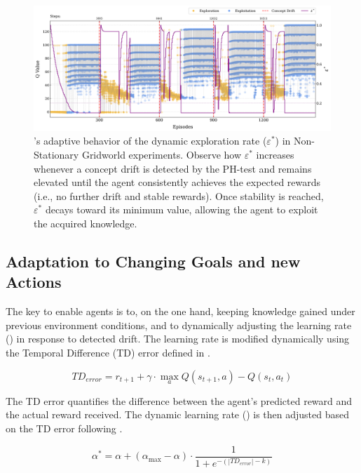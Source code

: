 \begin{figure}[hptb]
    \centering
    \includegraphics[width=\textwidth]{figures/eps}
    \caption{\adaptiverl's adaptive behavior of the dynamic exploration rate ($\varepsilon^*$) in Non-Stationary Gridworld experiments. Observe how $\varepsilon^*$ increases whenever a concept drift is detected by the PH-test and remains elevated until the agent consistently achieves the expected rewards (i.e., no further drift and stable rewards). Once stability is reached, $\varepsilon^*$ decays toward its minimum value, allowing the agent to exploit the acquired knowledge.}
    \label{fig:dynamic-eps}
\end{figure}

\subsection{Adaptation to Changing Goals and new Actions}
\label{sec:morphin-adaptation}

The key to enable agents is to, on the one hand, keeping knowledge gained under previous 
environment conditions, and to dynamically adjusting the learning rate (\lrate{\alpha}) in response 
to detected drift. The learning rate is modified dynamically using the Temporal Difference (TD) error 
defined in .

\begin{equation} \label{eq:td_error}
    TD_{error} = r_{t+1} + \gamma \cdot \underset{a}{\max} Q(s_{t+1}, a) - Q(s_t, a_t)
\end{equation}

The TD error quantifies the difference between the agent's predicted reward and the actual reward 
received. The dynamic learning rate (\lrate{\alpha^*}) is then adjusted based on the TD error 
following .

\begin{equation}
    \label{eq:dynamic_learning_rate}
    \alpha^* = \alpha + (\alpha_{\max}-\alpha) \cdot \frac{1}{1 + e^{-(|TD_{error}|-k)}}
\end{equation}

